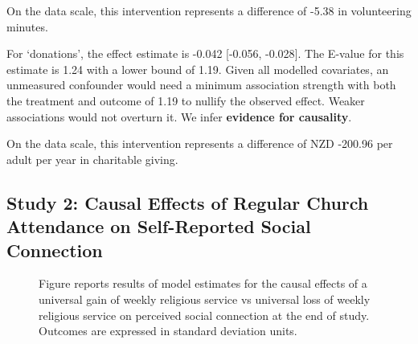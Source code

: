 \documentclass[
  single column]{article}
\begin{document}
On the data scale, this intervention represents a difference of -5.38 in
volunteering minutes.

For `donations', the effect estimate is -0.042 {[}-0.056, -0.028{]}. The
E-value for this estimate is 1.24 with a lower bound of 1.19. Given all
modelled covariates, an unmeasured confounder would need a minimum
association strength with both the treatment and outcome of 1.19 to
nullify the observed effect. Weaker associations would not overturn it.
We infer \textbf{evidence for causality}.

On the data scale, this intervention represents a difference of NZD
-200.96 per adult per year in charitable giving.

\newpage{}

\subsection{Study 2: Causal Effects of Regular Church Attendance on
Self-Reported Social
Connection}\label{study-2-causal-effects-of-regular-church-attendance-on-self-reported-social-connection}

\begin{figure}


\caption{\label{fig-2_1}Figure reports results of model estimates for
the causal effects of a universal gain of weekly religious service vs
universal loss of weekly religious service on perceived social
connection at the end of study. Outcomes are expressed in standard
deviation units.}

\end{figure}%
\end{document}
